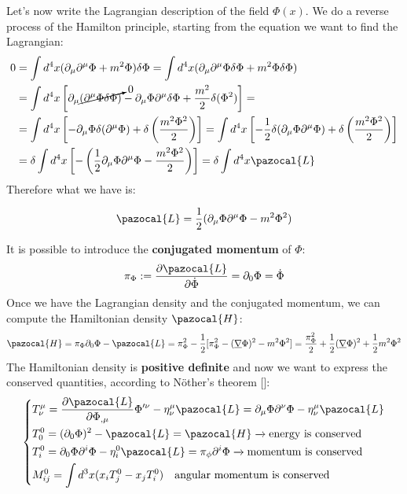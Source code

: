\documentclass[../main.tex]{subfiles}
\begin{document}
Let's now write the Lagrangian description of the field $\Phi(x)$. We do a reverse process of the Hamilton principle, starting from the equation we want to find the Lagrangian:
\begin{align*}
0&=\int d^4x(\partial_{\mu}\partial^{\mu}\Phi+m^2\Phi)\delta\Phi=\int d^4x(\partial_{\mu}\partial^{\mu}\Phi\delta\Phi+m^2\Phi\delta\Phi)\\
&=\int d^4x \left[\partial_{\mu}\cancelto{0}{(\partial^{\mu}\Phi\delta\Phi)}-\partial_{\mu}\Phi\partial^{\mu}\delta\Phi+\frac{m^2}{2}\delta(\Phi^2)\right]=\\
&=\int d^4x \left[-\partial_{\mu}\Phi\delta(\partial^{\mu}\Phi)+\delta\left(\frac{m^2\Phi^2}{2}\right)\right]=\int d^4x \left[-\frac{1}{2}\delta(\partial_{\mu}\Phi\partial^{\mu}\Phi)+\delta\left(\frac{m^2\Phi^2}{2}\right)\right]\\
&=\delta\int d^4x\left[-\left(\frac{1}{2}\partial_{\mu}\Phi\partial^{\mu}\Phi-\frac{m^2\Phi^2}{2}\right)\right]=\delta\int d^4x\pazocal{L}
\end{align*}
Therefore what we have is:
\begin{kaobox}[frametitle=Lagrangian density $\pazocal{L}$]
\[
\pazocal{L}=\frac{1}{2}(\partial_{\mu}\Phi\partial^\mu\Phi-m^2\Phi^2)
\]
\end{kaobox}
It is possible to introduce the \textbf{conjugated momentum} of $\Phi$:
\[
\pi_\Phi:=\frac{\partial\pazocal{L}}{\partial\Dot{\Phi}}=\partial_0\Phi=\Dot{\Phi}
\]
Once we have the Lagrangian density and the conjugated momentum, we can compute the Hamiltonian density $\pazocal{H}$:
\[
\pazocal{H}=\pi_\Phi\partial_0\Phi-\pazocal{L}=\pi^2_\Phi-\frac{1}{2}[\pi^2_\Phi-(\underline{\nabla}\Phi)^2-m^2\Phi^2]=\frac{\pi^2_\Phi}{2}+\frac{1}{2}(\underline{\nabla}\Phi)^2+\frac{1}{2}m^2\Phi^2
\]
The Hamiltonian density is \textbf{positive definite} and now we want to express the conserved quantities, according to N\"other's theorem []:
\[
\left\{
\begin{aligned}
&T^\mu_\nu=\frac{\partial\pazocal{L}}{\partial\Phi_{,\mu}}\Phi'^\nu-\eta^\mu_\nu\pazocal{L}=\partial_\mu\Phi\partial^\nu\Phi-\eta^\mu_\nu\pazocal{L}\\
&T^0_0=(\partial_0\Phi)^2-\pazocal{L}=\pazocal{H}\xrightarrow[]{}\text{energy is conserved}\\
&T^0_i=\partial_0\Phi\partial^i\Phi-\eta^0_i\pazocal{L}=\pi_\phi\partial^i\Phi\xrightarrow[]{}\text{momentum is conserved}\\
&M^0_{ij}=\int d^3x(x_iT^0_j-x_jT^0_i) \quad \text{angular momentum is conserved}
\end{aligned}
\right.
\]
\end{document}
